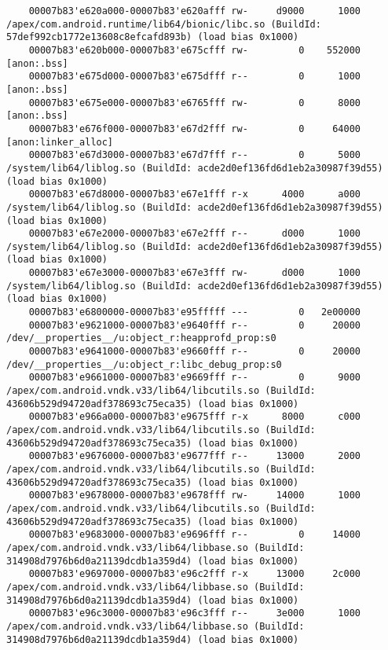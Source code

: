 \begin{lstlisting}
    00007b83'e620a000-00007b83'e620afff rw-     d9000      1000  /apex/com.android.runtime/lib64/bionic/libc.so (BuildId: 57def992cb1772e13608c8efcafd893b) (load bias 0x1000)
    00007b83'e620b000-00007b83'e675cfff rw-         0    552000  [anon:.bss]
    00007b83'e675d000-00007b83'e675dfff r--         0      1000  [anon:.bss]
    00007b83'e675e000-00007b83'e6765fff rw-         0      8000  [anon:.bss]
    00007b83'e676f000-00007b83'e67d2fff rw-         0     64000  [anon:linker_alloc]
    00007b83'e67d3000-00007b83'e67d7fff r--         0      5000  /system/lib64/liblog.so (BuildId: acde2d0ef136fd6d1eb2a30987f39d55) (load bias 0x1000)
    00007b83'e67d8000-00007b83'e67e1fff r-x      4000      a000  /system/lib64/liblog.so (BuildId: acde2d0ef136fd6d1eb2a30987f39d55) (load bias 0x1000)
    00007b83'e67e2000-00007b83'e67e2fff r--      d000      1000  /system/lib64/liblog.so (BuildId: acde2d0ef136fd6d1eb2a30987f39d55) (load bias 0x1000)
    00007b83'e67e3000-00007b83'e67e3fff rw-      d000      1000  /system/lib64/liblog.so (BuildId: acde2d0ef136fd6d1eb2a30987f39d55) (load bias 0x1000)
    00007b83'e6800000-00007b83'e95fffff ---         0   2e00000
    00007b83'e9621000-00007b83'e9640fff r--         0     20000  /dev/__properties__/u:object_r:heapprofd_prop:s0
    00007b83'e9641000-00007b83'e9660fff r--         0     20000  /dev/__properties__/u:object_r:libc_debug_prop:s0
    00007b83'e9661000-00007b83'e9669fff r--         0      9000  /apex/com.android.vndk.v33/lib64/libcutils.so (BuildId: 43606b529d94720adf378693c75eca35) (load bias 0x1000)
    00007b83'e966a000-00007b83'e9675fff r-x      8000      c000  /apex/com.android.vndk.v33/lib64/libcutils.so (BuildId: 43606b529d94720adf378693c75eca35) (load bias 0x1000)
    00007b83'e9676000-00007b83'e9677fff r--     13000      2000  /apex/com.android.vndk.v33/lib64/libcutils.so (BuildId: 43606b529d94720adf378693c75eca35) (load bias 0x1000)
    00007b83'e9678000-00007b83'e9678fff rw-     14000      1000  /apex/com.android.vndk.v33/lib64/libcutils.so (BuildId: 43606b529d94720adf378693c75eca35) (load bias 0x1000)
    00007b83'e9683000-00007b83'e9696fff r--         0     14000  /apex/com.android.vndk.v33/lib64/libbase.so (BuildId: 314908d7976b6d0a21139dcdb1a359d4) (load bias 0x1000)
    00007b83'e9697000-00007b83'e96c2fff r-x     13000     2c000  /apex/com.android.vndk.v33/lib64/libbase.so (BuildId: 314908d7976b6d0a21139dcdb1a359d4) (load bias 0x1000)
    00007b83'e96c3000-00007b83'e96c3fff r--     3e000      1000  /apex/com.android.vndk.v33/lib64/libbase.so (BuildId: 314908d7976b6d0a21139dcdb1a359d4) (load bias 0x1000)

\end{lstlisting}
